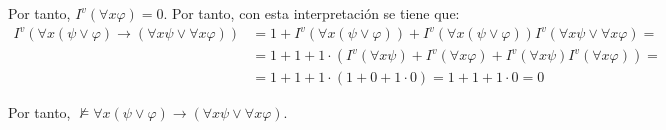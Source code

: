 \begin{ejercicio}
    Por tanto, $I^v(\forall x \varphi)=0$. Por tanto, con esta interpretación se tiene que:
    \begin{align*}
        I^v\left(\forall x(\psi \vee \varphi) \rightarrow (\forall x \psi \vee \forall x \varphi)\right)
        &= 1+I^v(\forall x(\psi \vee \varphi))+I^v(\forall x(\psi \vee \varphi))I^v(\forall x \psi \vee \forall x \varphi) =\\&= 1+1+1\cdot \left(I^v(\forall x \psi) + I^v(\forall x \varphi) + I^v(\forall x \psi)I^v(\forall x \varphi)\right) =\\&= 1+1+1\cdot(1+0+1\cdot 0) = 1+1+1\cdot 0 = 0
    \end{align*}

    Por tanto, $\not\models \forall x(\psi \vee \varphi) \rightarrow (\forall x \psi \vee \forall x \varphi)$.
\end{ejercicio}

\begin{comment}
\setcounter{ejercicio}{7}
\begin{ejercicio}\label{ej:2.8}
    $\models \forall x(\psi \rightarrow \varphi) \rightarrow (\exists x \psi \rightarrow \exists x \varphi)$.
\end{ejercicio}
\end{comment}

\begin{comment}
\setcounter{ejercicio}{8}
\begin{ejercicio}\label{ej:2.9}
    $\models \exists x(\psi \rightarrow \varphi) \rightarrow (\forall x \psi \rightarrow \varphi)$, supuesto que $x$ no aparece libre en $\varphi$ (pista: intenta probar $\{\neg \varphi, \forall x \psi\} \models \forall x \neg (\psi \rightarrow \varphi)$).
\end{ejercicio}
\end{comment}

\begin{comment}
\setcounter{ejercicio}{9}
\begin{ejercicio}\label{ej:2.10}
    $\models \neg \forall x \psi \rightarrow \exists x \neg \psi$.
\end{ejercicio}
\end{comment}

\begin{comment}
\setcounter{ejercicio}{10}
\begin{ejercicio}\label{ej:2.11}
    Si $x$ no aparece libre en $\psi$, $\models (\forall x \varphi \rightarrow \psi) \rightarrow \exists x(\varphi \rightarrow \psi)$.
\end{ejercicio}
\end{comment}
